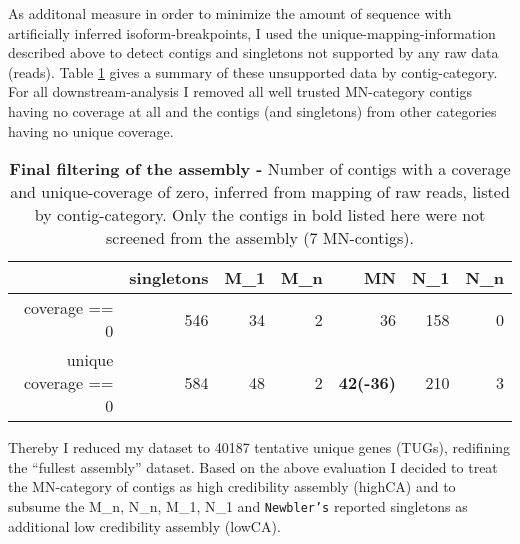As additonal measure in order to minimize the amount of sequence with
artificially inferred isoform-breakpoints, I used the
unique-mapping-information described above to detect contigs and
singletons not supported by any raw data (reads). Table
\ref{tab:cov.ex} gives a summary of these unsupported data by
contig-category. For all downstream-analysis I removed all well
trusted MN-category contigs having no coverage at all and the contigs
(and singletons) from other categories having no unique coverage.

\begin{table}[ht]
\begin{center}
\begin{tabular}{rrrrrrr}
  \hline
  & singletons & M\_1 & M\_n & MN & N\_1 & N\_n \\ 
  \hline
  coverage == 0 & 546 &  34 &  2 &  36 & 158 &  0 \\ 
  unique coverage == 0 & 584 &  48 &   2 &  \textbf{42(-36)} & 210 &   3 \\ 
  \hline
\end{tabular}
\caption[finalizing the assembly]{\textbf{Final filtering of the
    assembly -} Number of contigs with a coverage and unique-coverage
  of zero, inferred from mapping of raw reads, listed by
  contig-category. Only the contigs in bold listed here were not
  screened from the assembly (7 MN-contigs).}
\label{tab:cov.ex}
\end{center}
\end{table}

Thereby I reduced my dataset to 40187 tentative unique genes (TUGs),
redifining the ``fullest assembly'' dataset. Based on the above
evaluation I decided to treat the MN-category of contigs as high
credibility assembly (highCA) and to subsume the M\_n, N\_n, M\_1,
N\_1 and \texttt{Newbler's} reported singletons as additional low
credibility assembly (lowCA).

